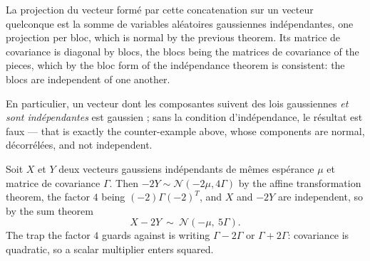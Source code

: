 \begin{remark}
La projection du vecteur formé par cette concatenation sur un vecteur quelconque
est la somme de variables aléatoires gaussiennes indépendantes, one projection
per bloc, which is normal by the previous theorem. Its matrice de covariance is
diagonal by blocs, the blocs being the matrices de covariance of the pieces,
which by the bloc form of the indépendance theorem is consistent: the blocs are
independent of one another.
\end{remark}

En particulier, un vecteur dont les composantes suivent des lois gaussiennes
\emph{et sont indépendantes} est gaussien ; sans la condition d'indépendance, le
résultat est faux --- that is exactly the counter-example above, whose components
are normal, décorrélées, and not independent.

\begin{example}
Soit $X$ et $Y$ deux vecteurs gaussiens indépendants de mêmes espérance $\mu$ et
matrice de covariance $\Gamma$. Then $-2Y \sim \mathcal{N}(-2\mu, 4\Gamma)$ by
the affine transformation theorem, the factor $4$ being $(-2)\Gamma(-2)^{T}$, and
$X$ and $-2Y$ are independent, so by the sum theorem
\[
  X - 2Y \ \sim\ \mathcal{N}\!\left(-\mu,\ 5\Gamma\right) .
\]
The trap the factor $4$ guards against is writing $\Gamma - 2\Gamma$ or
$\Gamma + 2\Gamma$: covariance is quadratic, so a scalar multiplier enters
squared.
\end{example}

